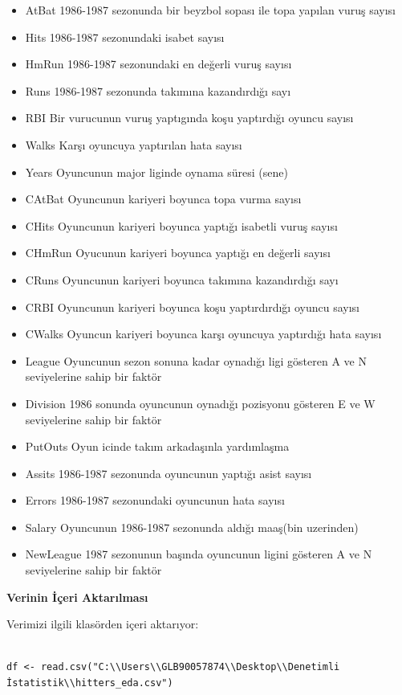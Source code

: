 \documentclass[
]{article}
\begin{document}
\begin{itemize}
\item
  AtBat 1986-1987 sezonunda bir beyzbol sopası ile topa yapılan vuruş
  sayısı
\item
  Hits 1986-1987 sezonundaki isabet sayısı
\item
  HmRun 1986-1987 sezonundaki en değerli vuruş sayısı
\item
  Runs 1986-1987 sezonunda takımına kazandırdığı sayı
\item
  RBI Bir vurucunun vuruş yaptıgında koşu yaptırdığı oyuncu sayısı
\item
  Walks Karşı oyuncuya yaptırılan hata sayısı
\item
  Years Oyuncunun major liginde oynama süresi (sene)
\item
  CAtBat Oyuncunun kariyeri boyunca topa vurma sayısı
\item
  CHits Oyuncunun kariyeri boyunca yaptığı isabetli vuruş sayısı
\item
  CHmRun Oyucunun kariyeri boyunca yaptığı en değerli sayısı
\item
  CRuns Oyuncunun kariyeri boyunca takımına kazandırdığı sayı
\item
  CRBI Oyuncunun kariyeri boyunca koşu yaptırdırdığı oyuncu sayısı
\item
  CWalks Oyuncun kariyeri boyunca karşı oyuncuya yaptırdığı hata sayısı
\item
  League Oyuncunun sezon sonuna kadar oynadığı ligi gösteren A ve N
  seviyelerine sahip bir faktör
\item
  Division 1986 sonunda oyuncunun oynadığı pozisyonu gösteren E ve W
  seviyelerine sahip bir faktör
\item
  PutOuts Oyun icinde takım arkadaşınla yardımlaşma
\item
  Assits 1986-1987 sezonunda oyuncunun yaptığı asist sayısı
\item
  Errors 1986-1987 sezonundaki oyuncunun hata sayısı
\item
  Salary Oyuncunun 1986-1987 sezonunda aldığı maaş(bin uzerinden)
\item
  NewLeague 1987 sezonunun başında oyuncunun ligini gösteren A ve N
  seviyelerine sahip bir faktör
\end{itemize}

\textbf{Verinin İçeri Aktarılması}

Verimizi ilgili klasörden içeri aktarıyor:

\begin{verbatim}

df <- read.csv("C:\\Users\\GLB90057874\\Desktop\\Denetimli İstatistik\\hitters_eda.csv")
\end{verbatim}
\end{document}
